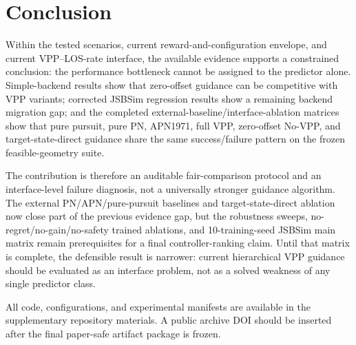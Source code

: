 \section{Conclusion}\label{sec:conclusion}

Within the tested scenarios, current reward-and-configuration envelope, and current VPP--LOS-rate interface, the available evidence supports a constrained conclusion: the performance bottleneck cannot be assigned to the predictor alone. Simple-backend results show that zero-offset guidance can be competitive with VPP variants; corrected JSBSim regression results show a remaining backend migration gap; and the completed external-baseline/interface-ablation matrices show that pure pursuit, pure PN, APN1971, full VPP, zero-offset No-VPP, and target-state-direct guidance share the same success/failure pattern on the frozen feasible-geometry suite.

The contribution is therefore an auditable fair-comparison protocol and an interface-level failure diagnosis, not a universally stronger guidance algorithm. The external PN/APN/pure-pursuit baselines and target-state-direct ablation now close part of the previous evidence gap, but the robustness sweeps, no-regret/no-gain/no-safety trained ablations, and 10-training-seed JSBSim main matrix remain prerequisites for a final controller-ranking claim. Until that matrix is complete, the defensible result is narrower: current hierarchical VPP guidance should be evaluated as an interface problem, not as a solved weakness of any single predictor class.

All code, configurations, and experimental manifests are available in the supplementary repository materials. A public archive DOI should be inserted after the final paper-safe artifact package is frozen.
